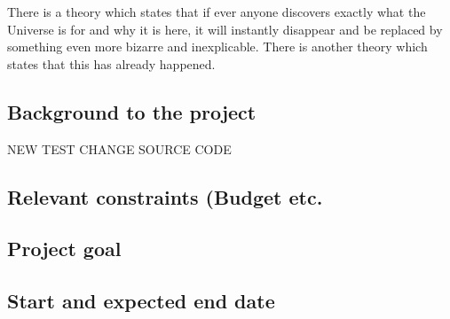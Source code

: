 There is a theory which states that if ever anyone discovers exactly what the Universe is for and why it is here, it will instantly disappear and be replaced by something even more bizarre and inexplicable.
There is another theory which states that this has already happened.

\subsection{Background to the project}
NEW TEST CHANGE SOURCE CODE 
\subsection{Relevant constraints (Budget etc.}

\subsection{Project goal}

\subsection{Start and expected end date}